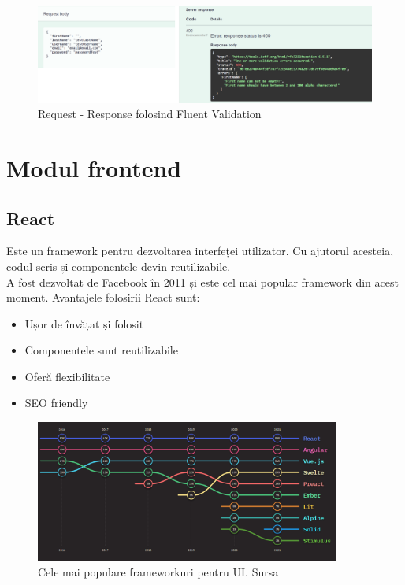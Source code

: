 \begin{figure}[H]
	\centering
	\includegraphics[width=150mm]{figs/fluentValidations.png}
	\caption{Request - Response folosind Fluent Validation}
	\label{fig:fluentValidation}
\end{figure}
\section{Modul frontend}
\subsection{React}
Este un framework pentru dezvoltarea interfeței utilizator. Cu ajutorul acesteia, codul scris și componentele devin reutilizabile.\\
A fost dezvoltat de Facebook în 2011 și este cel mai popular framework din acest moment. 
Avantajele folosirii React sunt: 
\begin{itemize}
	\setlength\itemsep{0.5em}
    \item Ușor de învățat și folosit
    \item Componentele sunt reutilizabile
    \item Oferă flexibilitate
    \item SEO friendly
\end{itemize}

\begin{figure}[H]
	\centering
	\includegraphics[width=100mm, scale=2]{figs/uiFrameworks.png}
    \caption{Cele mai populare frameworkuri pentru UI. Sursa~\cite{UIPopularity}}
    \label{fig:uiFrameworks}
\end{figure}
